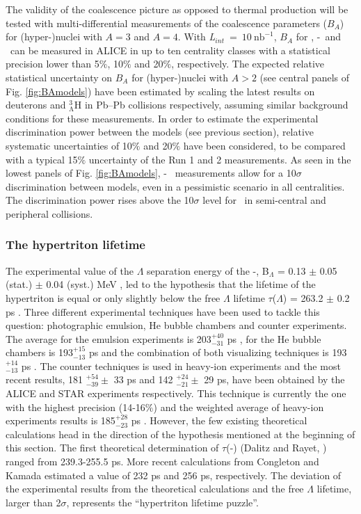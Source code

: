The validity of the coalescence picture as opposed to thermal production will be tested with multi-differential measurements of the coalescence parameters ($B_A$) for (hyper-)nuclei with $A=3$ and $A=4$. 
With \textit{L}$_{int}~=~10~\mathrm{nb}^{-1}$, $B_A$ for \hethree, \hyp~and \hefour~can be measured in ALICE in up to ten centrality classes with a statistical precision lower than 5$\%$, 10$\%$ and 20$\%$, respectively. 
The expected relative statistical uncertainty on $B_A$ for (hyper-)nuclei with $A>2$ (see central panels of Fig. \ref{fig:BAmodels}) have been estimated by scaling the latest results on deuterons and $\mathrm{^{3}_{\Lambda}H}$ in Pb--Pb collisions respectively, assuming similar background conditions for these measurements. 
In order to estimate the experimental discrimination power between the models (see previous section), relative systematic uncertainties of 10$\%$ and 20$\%$ have been considered, to be compared with a typical 15$\%$ uncertainty of the Run 1 and 2 measurements. 
As seen in the lowest panels of Fig. \ref{fig:BAmodels}, \hyp~ measurements allow for a 10$\sigma$ discrimination between models, even in a pessimistic scenario in all centralities. The discrimination power rises above the 10$\sigma$ level for \hefour~in semi-central and peripheral collisions.  

\subsubsection{The hypertriton lifetime}
The experimental value of the $\Lambda$ separation energy of the \hyp, B$_{\Lambda}$ = 0.13 $\pm$ 0.05 (stat.) $\pm$ 0.04 (syst.) MeV \cite{davis20053}, led to the hypothesis that the lifetime of the hypertriton is equal or only slightly below the free $\Lambda$ lifetime $\tau$($\Lambda$) = 263.2 $\pm$ 0.2 ps \cite{pdg:2017}.
Three different experimental techniques have been used to tackle this question: photographic emulsion, He bubble chambers and counter experiments. The average for the emulsion experiments is 203$^{+40}_{-31}$ ps \cite{agnello:2016}, for the He bubble chambers is 193$^{+15}_{-13}$ ps \cite{agnello:2016} and the combination of both visualizing techniques is 193$^{+14}_{-13}$ ps \cite{agnello:2016}. The counter techniques is used in heavy-ion experiments and the most recent results, 181 $^{+54}_{-39} \pm$ 33 ps and 142 $^{+24}_{-21} \pm$ 29 ps, have been obtained by the ALICE \cite{PhysLettB.754.360} and STAR \cite{PhysRevC.97.054909} experiments respectively. This technique is currently the one with the highest precision (14-16$\%$) and the weighted average of heavy-ion experiments results is 185$^{+28}_{-23}$ ps \cite{agnello:2016}.
However, the few existing theoretical calculations head in the direction of the hypothesis mentioned at the beginning of this section. 
The first theoretical determination of $\tau$(\hyp) (Dalitz and Rayet, \cite{NuovCim.A46}) ranged from 239.3-255.5 ps. More recent calculations from Congleton \cite{jphysg.18.339} and Kamada \cite{Phys.Rev.C57} estimated a value of 232 ps and 256 ps, respectively. The deviation of the experimental results from the theoretical calculations and the free $\Lambda$ lifetime, larger than 2$\sigma$, represents the ``hypertriton lifetime puzzle''.
 
